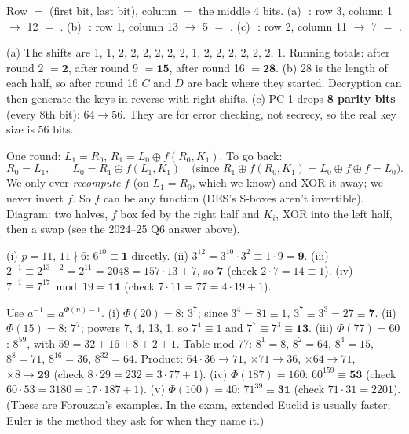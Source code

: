 \da Row $=$ (first bit, last bit), column $=$ the middle 4 bits.
(a) \,\,: row 3, column 1 $\to$ 12 $=$ \textbf{}.
(b) \,\,: row 1, column 13 $\to$ 5 $=$ \textbf{}.
(c) \,\,: row 2, column 11 $\to$ 7 $=$ \textbf{}.

\da (a) The shifts are 1, 1, 2, 2, 2, 2, 2, 2, 1, 2, 2, 2, 2, 2, 2, 1. Running totals: after round 2 $= \mathbf{2}$, after round 9 $= \mathbf{15}$, after round 16 $= \mathbf{28}$.
(b) 28 is the length of each half, so after round 16 $C$ and $D$ are back where they started. Decryption can then generate the keys in reverse with right shifts.
(c) PC-1 drops \textbf{8 parity bits} (every 8th bit): $64 \to 56$. They are for error checking, not secrecy, so the real key size is 56 bits.

\da One round: $L_1 = R_0$, \;$R_1 = L_0 \oplus f(R_0, K_1)$. To go back:
\[
R_0 = L_1, \qquad L_0 = R_1 \oplus f(L_1, K_1) \quad\text{(since } R_1 \oplus f(R_0, K_1) = L_0 \oplus f \oplus f = L_0\text{)}.
\]
We only ever \emph{recompute} $f$ (on $L_1 = R_0$, which we know) and XOR it away; we never invert $f$. So $f$ can be any function (DES's S-boxes aren't invertible). Diagram: two halves, $f$ box fed by the right half and $K_i$, XOR into the left half, then a swap (see the 2024--25 Q6 answer above).

\da (i) $p = 11$, $11 \nmid 6$: $6^{10} \equiv \mathbf{1}$ directly.
(ii) $3^{12} = 3^{10}\cdot3^2 \equiv 1 \cdot 9 = \mathbf{9}$.
(iii) $2^{-1} \equiv 2^{13-2} = 2^{11} = 2048 = 157\cdot13 + 7$, so $\mathbf{7}$ (check $2\cdot7 = 14 \equiv 1$).
(iv) $7^{-1} \equiv 7^{17} \bmod 19 = \mathbf{11}$ (check $7\cdot11 = 77 = 4\cdot19 + 1$).

\da Use $a^{-1} \equiv a^{\Phi(n) - 1}$.
(i) $\Phi(20) = 8$: $3^7$; since $3^4 = 81 \equiv 1$, $3^7 \equiv 3^3 = 27 \equiv \mathbf{7}$.
(ii) $\Phi(15) = 8$: $7^7$; powers 7, 4, 13, 1, so $7^4 \equiv 1$ and $7^7 \equiv 7^3 \equiv \mathbf{13}$.
(iii) $\Phi(77) = 60$: $8^{59}$, with $59 = 32 + 16 + 8 + 2 + 1$. Table mod 77: $8^1 = 8$, $8^2 = 64$, $8^4 = 15$, $8^8 = 71$, $8^{16} = 36$, $8^{32} = 64$.
Product: $64\cdot36 \to 71$, $\times71 \to 36$, $\times64 \to 71$, $\times8 \to \mathbf{29}$ (check $8\cdot29 = 232 = 3\cdot77 + 1$).
(iv) $\Phi(187) = 160$: $60^{159} \equiv \mathbf{53}$ (check $60\cdot53 = 3180 = 17\cdot187 + 1$).
(v) $\Phi(100) = 40$: $71^{39} \equiv \mathbf{31}$ (check $71\cdot31 = 2201$).
(These are Forouzan's examples. In the exam, extended Euclid is usually faster; Euler is the method they ask for when they name it.)

